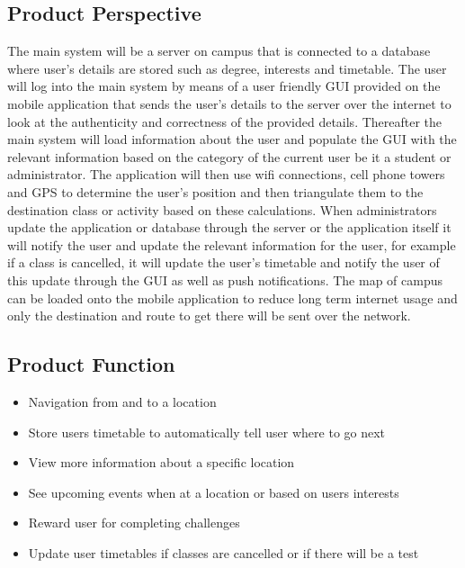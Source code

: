 \documentclass{article}
\begin{document}
	\subsection{Product Perspective}
		The main system will be a server on campus that is connected to a database where user's details are stored such as degree, interests and timetable. The user will log into the main system by means of a user friendly GUI provided on the mobile application that sends the user's details to the server over the internet to look at the authenticity and correctness of the provided details. Thereafter the main system will load information about the user and populate the GUI with the relevant information based on the category of the current user be it a student or administrator. The application will then use wifi connections, cell phone towers and GPS to determine the user's position and then triangulate them to the destination class or activity based on these calculations. When administrators update the application or database through the server or the application itself it will notify the user and update the relevant information for the user, for example if a class is cancelled, it will update the user's timetable and notify the user of this update through the GUI as well as push notifications. The map of campus can be loaded onto the mobile application to reduce long term internet usage and only the destination and route to get there will be sent over the network.
	\subsection{Product Function}
		\begin{itemize}
 	\item Navigation from and to a location
 	\item Store users timetable to automatically tell user where to go next
	\item View more information about a specific location
 	\item See upcoming events when at a location or based on users interests
 	\item Reward user for completing challenges 
 	\item Update user timetables if classes are cancelled or if there will be a test
 	\end{itemize}
\end{document}
